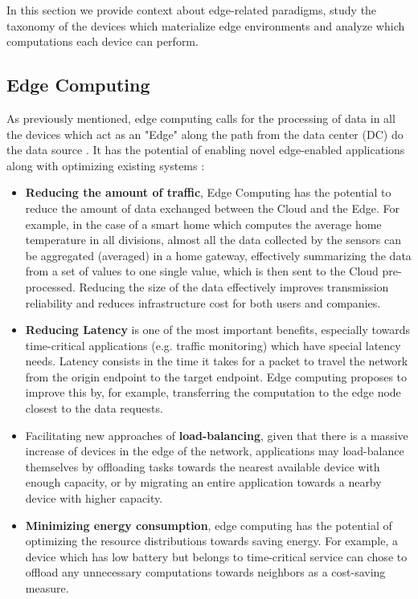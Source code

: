
In this section we provide context about edge-related paradigms, study the taxonomy of the devices which materialize edge environments and analyze which computations each device can perform.

\subsection{Edge Computing}

As previously mentioned, edge computing calls for the processing of data in all the devices which act as an "Edge" along the path from the data center (DC) do the data source \cite{Leitao2018}. It has the potential of enabling novel edge-enabled applications along with optimizing existing systems \cite{7488250}:

\begin{itemize}

    \item \textbf{Reducing the amount of traffic}, Edge Computing has the potential to reduce the amount of data exchanged between the Cloud and the Edge. For example, in the case of a smart home which computes the average home temperature in all divisions, almost all the data collected by the sensors can be aggregated (averaged) in a home gateway, effectively summarizing the data from a set of values to one single value, which is then sent to the Cloud pre-processed. Reducing the size of the data effectively improves transmission reliability and reduces infrastructure cost for both users and companies. 
    
    \item \textbf{Reducing Latency} is one of the most important benefits, especially towards time-critical applications (e.g. traffic monitoring) which have special latency needs. Latency consists in the time it takes for a packet to travel the network from the origin endpoint to the target endpoint. Edge computing proposes to improve this by, for example, transferring the computation to the edge node closest to the data requests.

    \item Facilitating new approaches of \textbf{load-balancing}, given that there is a massive increase of devices in the edge of the network, applications may load-balance themselves by offloading tasks towards the nearest available device with enough capacity, or by migrating an entire application towards a nearby device with higher capacity.
    
    \item \textbf{Minimizing energy consumption}, edge computing has the potential of optimizing the resource distributions towards saving energy. For example, a device which has low battery but belongs to time-critical service can chose to offload any unnecessary computations towards neighbors as a cost-saving measure. 
    
\end{itemize}

